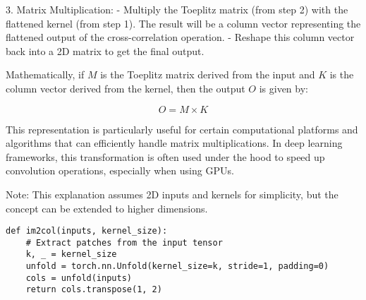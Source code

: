 3. Matrix Multiplication:
    - Multiply the Toeplitz matrix (from step 2) with the flattened kernel (from step 1). The result will be a column vector representing the flattened output of the cross-correlation operation.
    - Reshape this column vector back into a 2D matrix to get the final output.

Mathematically, if \( M \) is the Toeplitz matrix derived from the input and \( K \) is the column vector derived from the kernel, then the output \( O \) is given by:

\[ O = M \times K \]

This representation is particularly useful for certain computational platforms and algorithms that can efficiently handle matrix multiplications.
In deep learning frameworks, this transformation is often used under the hood to speed up convolution operations, especially when using GPUs.

Note: This explanation assumes 2D inputs and kernels for simplicity, but the concept can be extended to higher dimensions.

\begin{verbatim}
def im2col(inputs, kernel_size):
    # Extract patches from the input tensor
    k, _ = kernel_size
    unfold = torch.nn.Unfold(kernel_size=k, stride=1, padding=0)
    cols = unfold(inputs)
    return cols.transpose(1, 2)
\end{verbatim}

